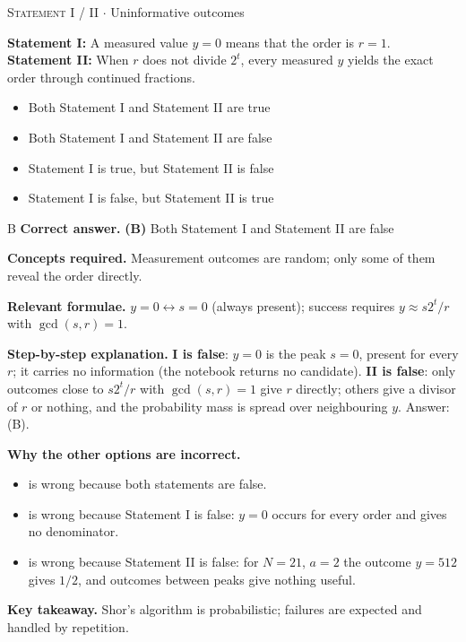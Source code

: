 \documentclass[11pt,a4paper]{article}
\newcommand{\optlabel}[1]{\textbf{(#1)}}
\newcommand{\correctlabel}[1]{\textcolor{okgreen}{\textbf{(#1)}\,\ding{51}}}
\newenvironment{qitem}[1]{\begin{list}{}{\setlength{\leftmargin}{3.3em}\setlength{\labelwidth}{3.1em}%
  \setlength{\labelsep}{0.2em}\setlength{\topsep}{3pt}\setlength{\parsep}{3pt}}\item[\textbf{Q.#1}\hfill]}{\end{list}}
\newcommand{\qsep}{\par\vspace{2pt}{\color{black!15}\hrule}\vspace{4pt}}
\newcommand{\qmeta}[2]{{\footnotesize\color{black!60}\textsc{#1} \;$\cdot$\; #2}\par}
\begin{document}
\begin{qitem}{58}
\qmeta{Statement I / II}{Uninformative outcomes}
\textbf{Statement I:} A measured value $y = 0$ means that the order is $r = 1$.\\[1mm]
\textbf{Statement II:} When $r$ does not divide $2^t$, every measured $y$ yields the exact order through continued fractions.
\begin{itemize}[leftmargin=2.6em, labelsep=0.4em, itemsep=2pt, topsep=3pt]
\item[\optlabel{A}] Both Statement I and Statement II are true
\item[\correctlabel{B}] Both Statement I and Statement II are false
\item[\optlabel{C}] Statement I is true, but Statement II is false
\item[\optlabel{D}] Statement I is false, but Statement II is true
\end{itemize}
\end{qitem}
\begin{solbox}{B}
\textbf{\color{brand}Correct answer.} \textcolor{okgreen}{\textbf{(B)}} Both Statement I and Statement II are false

\textbf{\color{brand}Concepts required.} Measurement outcomes are random; only some of them reveal the order directly.

\textbf{\color{brand}Relevant formulae.} $y = 0 \leftrightarrow s = 0$ (always present); success requires $y \approx s2^t/r$ with $\gcd(s, r) = 1$.

\textbf{\color{brand}Step-by-step explanation.} \textbf{I is false}: $y = 0$ is the peak $s = 0$, present for every $r$; it carries no information (the notebook returns no candidate). \textbf{II is false}: only
outcomes close to $s2^t/r$ with $\gcd(s, r) = 1$ give $r$ directly; others give a divisor of $r$ or nothing, and the probability mass is spread over neighbouring $y$.
Answer: (B).

\textbf{\color{brand}Why the other options are incorrect.}
\begin{itemize}[leftmargin=2.4em, itemsep=1pt, topsep=2pt]
\item[\textbf{(A)}] is wrong because both statements are false.
\item[\textbf{(C)}] is wrong because Statement I is false: $y = 0$ occurs for every order and gives no denominator.
\item[\textbf{(D)}] is wrong because Statement II is false: for $N = 21$, $a = 2$ the outcome $y = 512$ gives $1/2$, and outcomes between peaks give nothing useful.
\end{itemize}
\textbf{\color{brand}Key takeaway.} Shor's algorithm is probabilistic; failures are expected and handled by repetition.
\end{solbox}
\qsep
\end{document}

